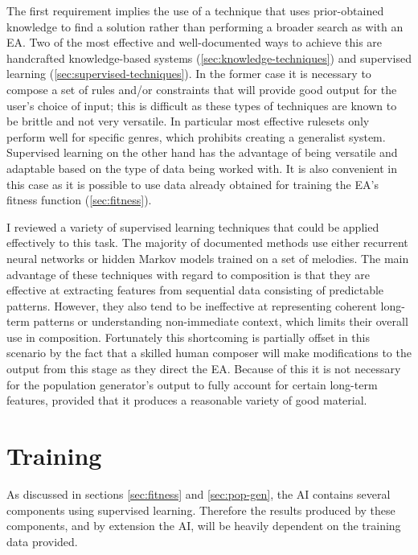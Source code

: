 \documentclass[ author={Stephen Livermore-Tozer},
				supervisor={Dr. Peter Flach},
				degree={MEng},
				title={Performing Algorithmic Co-composition Using Machine Learning},
				subtitle={},
				type={research},
				year={2016} ]{dissertation}
\begin{document}
	The first requirement implies the use of a technique that uses prior-obtained knowledge to find a solution rather than performing a broader search as with an EA. Two of the most effective and well-documented ways to achieve this are handcrafted knowledge-based systems (\ref{sec:knowledge-techniques}) and supervised learning (\ref{sec:supervised-techniques}). In the former case it is necessary to compose a set of rules and/or constraints that will provide good output for the user's choice of input; this is difficult as these types of techniques are known to be brittle and not very versatile.	In particular most effective rulesets only perform well for specific genres, which prohibits creating a generalist system. Supervised learning on the other hand has the advantage of being versatile and adaptable based on the type of data being worked with. It is also convenient in this case as it is possible to use data already obtained for training the EA's fitness function (\ref{sec:fitness}).
	
	I reviewed a variety of supervised learning techniques that could be applied effectively to this task. The majority of documented methods use either recurrent neural networks or hidden Markov models trained on a set of melodies. The main advantage of these techniques with regard to composition is that they are effective at extracting features from sequential data consisting of predictable patterns. However, they also tend to be ineffective at representing coherent long-term patterns or understanding non-immediate context, which limits their overall use in composition. Fortunately this shortcoming is partially offset in this scenario by the fact that a skilled human composer will make modifications to the output from this stage as they direct the EA. Because of this it is not necessary for the population generator's output to fully account for certain long-term features, provided that it produces a reasonable variety of good material.
	
	
	\section{Training}
	
	As discussed in sections \ref{sec:fitness} and \ref{sec:pop-gen}, the AI contains several components using supervised learning. Therefore the results produced by these components, and by extension the AI, will be heavily dependent on the training data provided.
	
\end{document}
